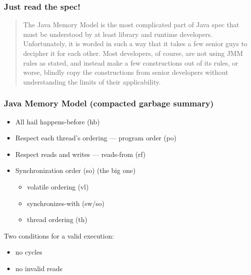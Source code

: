 \documentclass[aspectratio=1610, xcolor={dvipsnames}]{beamer}
\begin{document}
\begin{frame}
    \frametitle{Just read the spec!}

    \centering
    \begin{quote}
        The Java Memory Model is the most complicated part of Java spec that must be
        understood by at least library and runtime developers. Unfortunately, it is
        worded in such a way that it takes a few senior guys to decipher it for each
        other. Most developers, of course, are not using JMM rules as stated, and
        instead make a few constructions out of its rules, or worse, blindly copy the
        constructions from senior developers without understanding the limits of their
        applicability. \cite{pragmatics}
    \end{quote}
    
\end{frame}



\begin{frame}
    \frametitle{Java Memory Model (compacted garbage summary)}

    \begin{itemize}[<+->]
        \item All hail happens-before (hb)
        \item Respect each thread's ordering --- program order (po)
        \item Respect reads and writes --- reads-from (rf)
        \item Synchronization order (so) (the big one)
        \begin{itemize}
            \item volatile ordering (vl)
            \item synchronizes-with (sw/so)
            \item thread ordering (th)
        \end{itemize}
    \end{itemize}

    \pause
    Two conditions for a valid execution:
    \begin{itemize}
        \item no cycles
        \item no invalid reads
    \end{itemize}

\end{frame}
\end{document}
